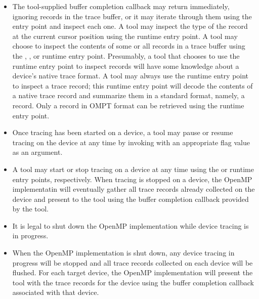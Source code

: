 \begin{itemize}
\item The tool-supplied buffer completion callback may return
  immediately, ignoring records in the trace buffer, or it may iterate
  through them using the  entry
  point
  and inspect each one. A tool may inspect the type of the record at
  the current cursor position using the 
  runtime entry point.  A tool may choose to inspect the contents of some or
  all records in a trace buffer using the ,
  , or
   runtime entry point.  Presumably, a tool that
  chooses to use the  runtime entry point to
  inspect records will have some knowledge about a device's native
  trace format.  A tool may always use the
   runtime entry point to inspect a trace
  record; this runtime entry point will decode the contents of a native trace record
  and summarize them in a standard format, namely, a
   record.
  Only a record in OMPT format can be retrieved using the
   runtime entry point.
\item Once tracing has been started on a device, a tool may pause or resume
  tracing on the device at any time by invoking
   with an appropriate flag value as an
  argument.  
\item A tool may start or stop tracing on a device at any time using the 
   or  runtime entry points,
  respectively. When tracing is stopped on a device, the OpenMP implementatin will eventually 
  gather all trace records already collected on the device and present to the tool using
  the buffer completion callback provided by the tool.
\item It is legal to shut down the OpenMP implementation while device tracing 
is in progress.  
\item When the OpenMP implementation is shut down, any device tracing in progress will be
  stopped and all trace records collected on each device will be flushed.
  For each target device, the OpenMP implementation will present the tool 
  with the trace records for the device using the buffer completion callback 
  associated with that device.
\end{itemize}


